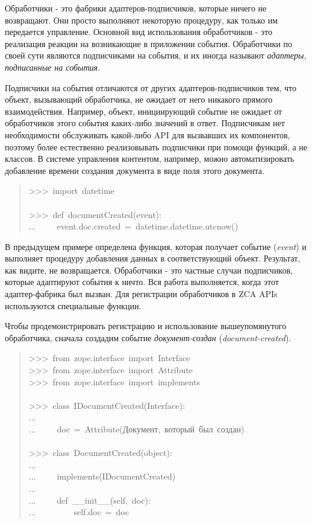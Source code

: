 \documentclass[14pt,a4paper,openany,twoside,final]{extbook}
\providecommand*{\DUroletitlereference}[1]{\textsl{#1}}
\begin{document}
Обработчики - это фабрики адаптеров-подписчиков, которые ничего не
возвращают.  Они просто выполняют некоторую процедуру, как только им
передается управление.  Основной вид использования обработчиков - это
реализация реакции на возникающие в приложении события.  Обработчики
по своей сути являются подписчиками на события, и их иногда называют
\DUroletitlereference{адаптеры, подписанные на события}.

Подписчики на события отличаются от других адаптеров-подписчиков тем,
что объект, вызывающий обработчика, не ожидает от него никакого
прямого взаимодействия.  Например, объект, инициирующий событие не
ожидает от обработчиков этого события каких-либо значений в ответ.
Подписчикам нет необходимости обслуживать какой-либо API для
вызвавших их компонентов, поэтому более естественно реализовывать
подписчики при помощи функций, а не классов.  В системе управления
контентом, например, можно автоматизировать добавление времени
создания документа в виде поля этого документа.

\begin{quote}{\ttfamily \raggedright \noindent
>{}>{}>~import~datetime\\
~\\
>{}>{}>~def~documentCreated(event):\\
...~~~~~event.doc.created~=~datetime.datetime.utcnow()
}
\end{quote}

В предыдущем примере определена функция, которая получает событие
(\DUroletitlereference{event}) и выполняет процедуру добавления данных в соответствующий
объект.  Результат, как видите, не возвращается.  Обработчики - это
частные случаи подписчиков, которые адаптируют события к \textquotedbl{}ничто\textquotedbl{}.  Вся
работа выполняется, когда этот адаптер-\textquotedbl{}фабрика\textquotedbl{} был вызван.  Для
регистрации обработчиков в ZCA APIs используются специальные функции.

Чтобы продемонстрировать регистрацию и использование вышеупомянутого
обработчика, сначала создадим событие \DUroletitlereference{документ-создан}
(\DUroletitlereference{document-created}).

\begin{quote}{\ttfamily \raggedright \noindent
>{}>{}>~from~zope.interface~import~Interface\\
>{}>{}>~from~zope.interface~import~Attribute\\
>{}>{}>~from~zope.interface~import~implements\\
~\\
>{}>{}>~class~IDocumentCreated(Interface):\\
...\\
...~~~~~doc~=~Attribute(\textquotedbl{}Документ,~который~был~создан\textquotedbl{})\\
~\\
>{}>{}>~class~DocumentCreated(object):\\
...\\
...~~~~~implements(IDocumentCreated)\\
...\\
...~~~~~def~\_\_init\_\_(self,~doc):\\
...~~~~~~~~~self.doc~=~doc
}
\end{quote}
\end{document}
